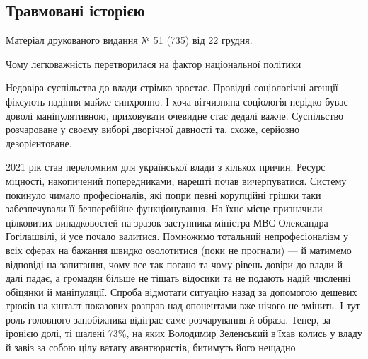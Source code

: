  
 
 
 
 
\subsection{Травмовані історією}
\label{sec:29_12_2021.stz.news.ua.tyzhden.1.travma_istoria}


Матеріал друкованого видання № 51 (735) від 22 грудня.

Чому легковажність перетворилася на фактор національної політики

Недовіра суспільства до влади стрімко зростає. Провідні соціологічні агенції
фіксують падіння майже синхронно. І хоча вітчизняна соціологія нерідко буває
доволі маніпулятивною, приховувати очевидне стає дедалі важче. Суспільство
розчароване у своєму виборі дворічної давності та, схоже, серйозно
дезорієнтоване.

2021 рік став переломним для української влади з кількох причин. Ресурс
міцності, накопичений попередниками, нарешті почав вичерпуватися. Систему
покинуло чимало професіоналів, які попри певні корупційні грішки таки
забезпечували її безперебійне функціонування. На їхнє місце призначили
цілковитих випадковостей на зразок заступника міністра МВС Олександра
Гогілашвілі, й усе почало валитися. Помножимо тотальний непрофесіоналізм у всіх
сферах на бажання швидко озолотитися (поки не прогнали) — й матимемо відповіді
на запитання, чому все так погано та чому рівень довіри до влади й далі падає,
а громадян більше не тішать відосики та не подають надій численні обіцянки й
маніпуляції. Спроба відмотати ситуацію назад за допомогою дешевих трюків на
кшталт показових розправ над опонентами вже нічого не змінить. І тут роль
головного запобіжника відіграє саме розчарування й образа. Тепер, за іронією
долі, ті шалені 73\%, на яких Володимир Зеленський в’їхав колись у владу й
завіз за собою цілу ватагу авантюристів, битимуть його нещадно.

